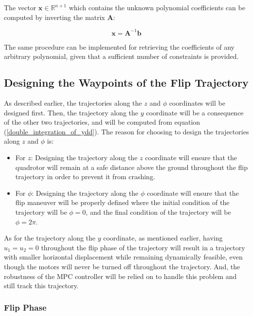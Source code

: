 \documentclass{thesisreport}
\begin{document}
The vector $\bm{x} \in \mathbb{R}^{n+1}$  which contains the unknown polynomial coefficients can be computed by inverting the matrix $\bm{A}$:

\begin{equation}
	\bm{x} = \bm{A}^{-1}\bm{b}
\end{equation}

The same procedure can be implemented for retrieving the coefficients of any arbitrary polynomial, given that a sufficient number of constraints is provided.

\newpage

\subsection{Designing the Waypoints of the Flip Trajectory}

As described earlier, the trajectories along the $z$ and $\phi$ coordinates will be designed first. Then, the trajectory along the $y$ coordinate will be a consequence of the other two trajectories, and will be computed from equation (\ref{double_integration_of_ydd}). The reason for choosing to design the trajectories along $z$ and $\phi$ is:

\begin{itemize}
	\item For $z$: Designing the trajectory along the $z$ coordinate will ensure that the quadrotor will remain at a safe distance above the ground throughout the flip trajectory in order to prevent it from crashing.
	\item For $\phi$: Designing the trajectory along the $\phi$ coordinate will ensure that the flip maneuver will be properly defined where the initial condition of the trajectory will be $\phi=0$, and the final condition of the trajectory will be $\phi=2\pi$. 
\end{itemize}

As for the trajectory along the $y$ coordinate, as mentioned earlier, having $u_1=u_2=0$ throughout the flip phase of the trajectory will result in a trajectory with smaller horizontal displacement while remaining dynamically feasible, even though the motors will never be turned off throughout the trajectory. And, the robustness of the MPC controller will be relied on to handle this problem and still track this trajectory.

\subsubsection*{Flip Phase}
\end{document}
